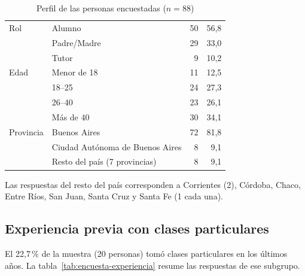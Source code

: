 \begin{table}[H]
    \centering
    \caption{Perfil de las personas encuestadas ($n = 88$)}
    \label{tab:encuesta-perfil}
    \small
    \begin{tabularx}{\textwidth}{l L r r}
        \toprule
         &  &  & \tb{\%} \\
        \midrule
        Rol       & Alumno                         & 50 & 56,8 \\
                  & Padre/Madre                    & 29 & 33,0 \\
                  & Tutor                          &  9 & 10,2 \\
        \addlinespace
        Edad      & Menor de 18                    & 11 & 12,5 \\
                  & 18--25                         & 24 & 27,3 \\
                  & 26--40                         & 23 & 26,1 \\
                  & Más de 40                      & 30 & 34,1 \\
        \addlinespace
        Provincia & Buenos Aires                   & 72 & 81,8 \\
                  & Ciudad Autónoma de Buenos Aires &  8 &  9,1 \\
                  & Resto del país (7 provincias)  &  8 &  9,1 \\
        \bottomrule
    \end{tabularx}
\end{table}

Las respuestas del resto del país corresponden a Corrientes (2),
Córdoba, Chaco, Entre Ríos, San Juan, Santa Cruz y Santa Fe (1 cada una).

\subsection{Experiencia previa con clases particulares}

El 22,7\,\% de la muestra (20 personas) tomó clases particulares en los
últimos años. La tabla~\ref{tab:encuesta-experiencia} resume las
respuestas de ese subgrupo.

